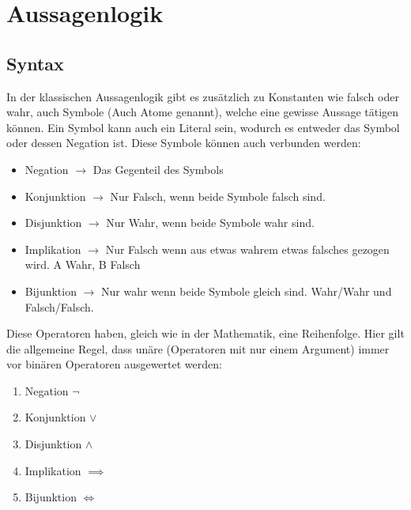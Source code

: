 \documentclass{article}
\begin{document}
		\section{Aussagenlogik}
		\subsection{Syntax}
		In der klassischen Aussagenlogik gibt es zusätzlich zu Konstanten wie falsch oder wahr, auch Symbole (Auch Atome genannt), welche eine gewisse Aussage tätigen können. Ein Symbol kann auch ein Literal sein, wodurch es entweder das Symbol oder dessen Negation ist. Diese Symbole können auch verbunden werden:
		\begin{itemize}
			\item{Negation $\to$ Das Gegenteil des Symbols}
			\item{Konjunktion $\to$ Nur Falsch, wenn beide Symbole falsch sind.}
			\item{Disjunktion $\to$ Nur Wahr, wenn beide Symbole wahr sind.}
			\item{Implikation $\to$ Nur Falsch wenn aus etwas wahrem etwas falsches gezogen wird. A Wahr, B Falsch}
			\item{Bijunktion $\to$ Nur wahr wenn beide Symbole gleich sind. Wahr/Wahr und Falsch/Falsch.}
		\end{itemize}
		Diese Operatoren haben, gleich wie in der Mathematik, eine Reihenfolge. Hier gilt die allgemeine Regel, dass unäre (Operatoren mit nur einem Argument) immer vor binären Operatoren ausgewertet werden:
		\begin{enumerate}
			\item{Negation $\neg$}
			\item{Konjunktion $\lor$}
			\item{Disjunktion $\land$}
			\item{Implikation $\implies $}
			\item{Bijunktion $\iff$}
		\end{enumerate}
\end{document}
